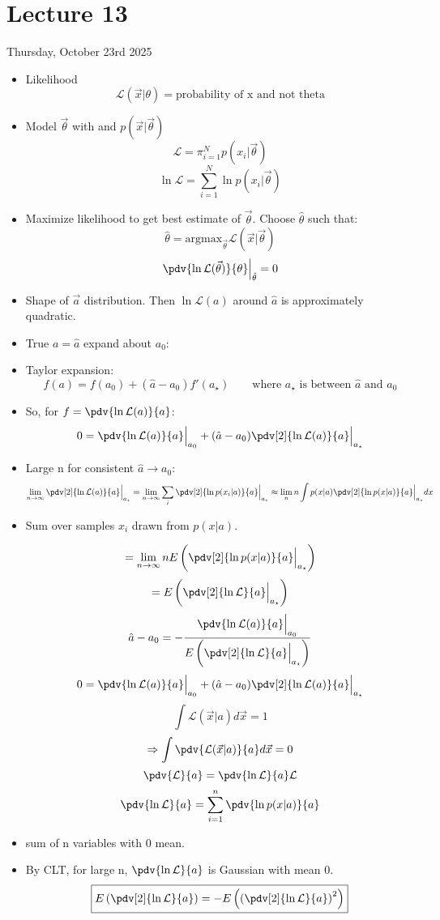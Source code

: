 \section{Lecture 13}

Thursday, October 23rd 2025

\begin{itemize}
    \item Likelihood
          \[ \mathcal{L}(\vec{x}|\theta) = \text{probability of x and not theta} \]
    \item Model $\vec{\theta}$ with and $p(\vec{x}|\vec{\theta})$
          \[ \mathcal{L} = \pi_{i=1}^{N} p(x_i|\vec{\theta}) \]
          \[ \ln \mathcal{L} = \sum_{i=1}^{N} \ln p(x_i|\vec{\theta}) \]
    \item Maximize likelihood to get best estimate of $\vec{\theta}$. Choose $\hat{\theta}$ such that:
          \[ \hat{\theta} = \text{argmax}_{\vec{\theta}} \mathcal{L}(\vec{x}|\vec{\theta}) \]
          \[ \pdv{\ln \mathcal{L(\vec{\theta})}}{\theta} \Big|_{\hat{\theta}} = 0 \]
    \item Shape of $\vec{a}$ distribution. Then $\ln \mathcal{L}(a) $ around $\hat{a}$ is approximately quadratic.
    \item True $a = \hat{a}$ expand about $a_0$:
    \item Taylor expansion:
          \[ f(a) = f(a_0) + (\hat{a} - a_0) f'(a_\star) \qquad \text{where } a_{\star} \text{ is between } \hat{a} \text{ and } a_0 \]
    \item So, for $f = \pdv{\ln \mathcal{L}(a)}{a}$:
          \[ 0 = \pdv{\ln \mathcal{L}(a)}{a} \Big|_{a_0} + (\hat{a} - a_0) \pdv[2]{\ln \mathcal{L}(a)}{a} \Big|_{a_{\star}} \]
    \item Large n for consistent $\hat{a} \to a_0$:
          \[ \lim_{n \to \infty} \pdv[2]{\ln \mathcal{L}(a)}{a} \Big|_{a_{\star}} = \lim_{n \to \infty} \sum_i \pdv[2]{\ln p(x_i|a)}{a} \Big|_{a_{\star}} \approx \lim_{n} n \int p(x|a) \pdv[2]{\ln p(x|a)}{a} \Big|_{a_{\star}} dx \]

    \item Sum over samples $x_i$ drawn from $p(x|a)$.

          \[ = \lim_{n \to \infty} n E\left( \pdv[2]{\ln p(x|a)}{a} \Big|_{a_{\star}} \right) \]
          \[ = E \left( \pdv[2]{\ln \mathcal{L}}{a} \Big|_{a_{\star}} \right) \]
          \[ \hat{a} - a_0 = - \frac{\pdv{\ln \mathcal{L}(a)}{a} \Big|_{a_0}}{E\left( \pdv[2]{\ln \mathcal{L}}{a} \Big|_{a_{\star}} \right)} \]
          \[ 0 = \pdv{\ln \mathcal{L}(a)}{a} \Big|_{a_0} + (\hat{a} - a_0) \pdv[2]{\ln \mathcal{L}(a)}{a} \Big|_{a_{\star}} \]
          \[ \int \mathcal{L}(\vec{x}|a) d\vec{x} = 1 \]
          \[ \Rightarrow \int \pdv{\mathcal{L}(\vec{x}|a)}{a} d\vec{x} = 0 \]
          \[ \pdv{\mathcal{L}}{a} = \pdv{\ln \mathcal{L}}{a} \mathcal{L} \]
          \[ \pdv{\ln \mathcal{L}}{a} = \sum_{i=1}^{n} \pdv{\ln p(x|a)}{a} \]
    \item sum of n variables with 0 mean.
    \item By CLT, for large n, $\pdv{\ln \mathcal{L}}{a}$ is Gaussian with mean 0.
          \[ \boxed{E\left(\pdv[2]{\ln \mathcal{L}}{a} \right) = - E \left( \left( \pdv[2]{\ln \mathcal{L}}{a} \right)^2 \right) }\]


\end{itemize}
